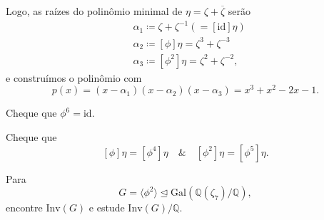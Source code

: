\documentclass[../algebraIII_notes.tex]{subfiles}
\begin{document}
\begin{example}
	Logo, as raízes do polinômio minimal de \(\eta = \zeta + \overline{\zeta }\) serão
	\begin{align*}
		 & \alpha_1 \coloneqq \zeta +\zeta^{-1} ( = [\mathrm{id}]\eta ) \\
		 & \alpha_2 \coloneqq [\phi ]\eta  = \zeta^{3} + \zeta^{-3}     \\
		 & \alpha_3 \coloneqq [\phi^{2}]\eta =\zeta^{2} + \zeta^{-2},
	\end{align*}
	e construímos o polinômio com
	\[
		p(x) = (x-\alpha_1)(x-\alpha_2)(x-\alpha_3) = x^{3} + x^{2} - 2x - 1.
	\]
\end{example}
\begin{exr}
	Cheque que \(\phi^{6} = \mathrm{id}\).
\end{exr}
\begin{exr}
	Cheque que
	\[
		[\phi ]\eta =[\phi^{4}]\eta \quad\&\quad [\phi^{2}]\eta =[\phi^{5}]\eta.
	\]
\end{exr}
\begin{exr}
	Para
	\[
		G = \langle \phi^{2} \rangle\trianglelefteq \mathrm{Gal}(\mathbb{Q}(\zeta_{7})/\mathbb{Q}),
	\]
	encontre \(\mathrm{Inv}(G)\) e estude \(\mathrm{Inv}(G)/\mathbb{Q}\).
\end{exr}
\end{document}
